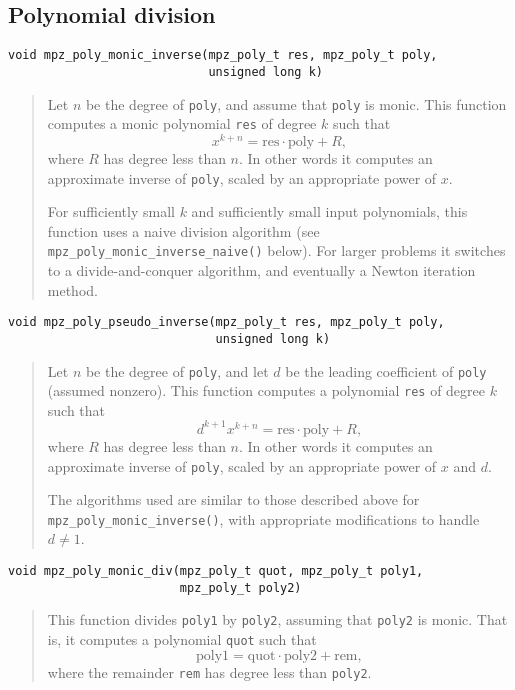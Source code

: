 \documentclass[a4paper,10pt]{article}
\newcommand{\code}{\lstinline}
\begin{document}
\subsection{Polynomial division}

\begin{lstlisting}
void mpz_poly_monic_inverse(mpz_poly_t res, mpz_poly_t poly,
                            unsigned long k)
\end{lstlisting}
\begin{quote}
Let $n$ be the degree of \code{poly}, and assume that \code{poly} is monic. This function computes a monic polynomial \code{res} of degree $k$ such that
 \[ x^{k+n} = \text{res} \cdot \text{poly} + R, \]
where $R$ has degree less than $n$. In other words it computes an approximate inverse of \code{poly}, scaled by an appropriate power of $x$.

For sufficiently small $k$ and sufficiently small input polynomials, this function uses a naive division algorithm (see \code{mpz_poly_monic_inverse_naive()} below). For larger problems it switches to a divide-and-conquer algorithm, and eventually a Newton iteration method.
\end{quote}


\begin{lstlisting}
void mpz_poly_pseudo_inverse(mpz_poly_t res, mpz_poly_t poly,
                             unsigned long k)
\end{lstlisting}
\begin{quote}
Let $n$ be the degree of \code{poly}, and let $d$ be the leading coefficient of \code{poly} (assumed nonzero). This function computes a polynomial \code{res} of degree $k$ such that
 \[ d^{k+1} x^{k+n} = \text{res} \cdot \text{poly} + R, \]
where $R$ has degree less than $n$. In other words it computes an approximate inverse of \code{poly}, scaled by an appropriate power of $x$ and $d$.

The algorithms used are similar to those described above for \code{mpz_poly_monic_inverse()}, with appropriate modifications to handle $d \neq 1$.
\end{quote}


\begin{lstlisting}
void mpz_poly_monic_div(mpz_poly_t quot, mpz_poly_t poly1,
                        mpz_poly_t poly2)
\end{lstlisting}
\begin{quote}
This function divides \code{poly1} by \code{poly2}, assuming that \code{poly2} is monic. That is, it computes a polynomial \code{quot} such that
 \[ \text{poly1} = \text{quot} \cdot \text{poly2} + \text{rem}, \]
where the remainder \code{rem} has degree less than \code{poly2}.
\end{quote}
\end{document}
